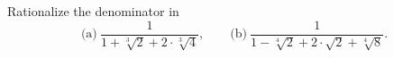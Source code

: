 Rationalize the denominator in
\[ \text{(a)}\ \frac{1}{1 + \sqrt[3]{2} + 2 \cdot \sqrt[3]{4}},\qquad \text{(b)}\ \frac{1}{1 - \sqrt[4]{2} + 2 \cdot \sqrt{2} + \sqrt[4]{8}}. \]

